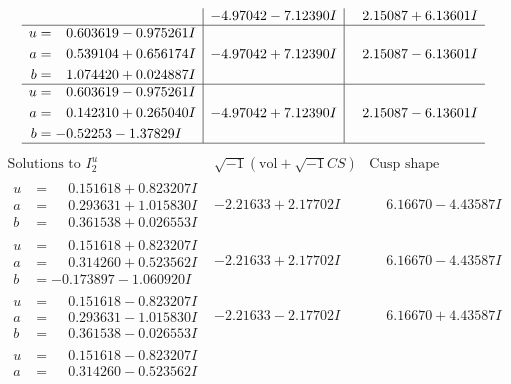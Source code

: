 \documentclass[1p]{elsarticle_modified}
\theoremstyle{definition}
\newcommand{\I}{\sqrt{-1}}
\begin{document}
$$\begin{array}{c|c|c}
 & -4.97042 - 7.12390 I & \phantom{-}2.15087 + 6.13601 I \\ \hline\begin{aligned}
u &= \phantom{-}0.603619 - 0.975261 I \\
a &= \phantom{-}0.539104 + 0.656174 I \\
b &= \phantom{-}1.074420 + 0.024887 I\end{aligned}
 & -4.97042 + 7.12390 I & \phantom{-}2.15087 - 6.13601 I \\ \hline\begin{aligned}
u &= \phantom{-}0.603619 - 0.975261 I \\
a &= \phantom{-}0.142310 + 0.265040 I \\
b &= -0.52253 - 1.37829 I\end{aligned}
 & -4.97042 + 7.12390 I & \phantom{-}2.15087 - 6.13601 I\\
 \hline 
 \end{array}$$\newpage$$\begin{array}{c|c|c}  
\text{Solutions to }I^u_{2}& \I (\text{vol} + \sqrt{-1}CS) & \text{Cusp shape}\\
 \hline 
\begin{aligned}
u &= \phantom{-}0.151618 + 0.823207 I \\
a &= \phantom{-}0.293631 + 1.015830 I \\
b &= \phantom{-}0.361538 + 0.026553 I\end{aligned}
 & -2.21633 + 2.17702 I & \phantom{-}6.16670 - 4.43587 I \\ \hline\begin{aligned}
u &= \phantom{-}0.151618 + 0.823207 I \\
a &= \phantom{-}0.314260 + 0.523562 I \\
b &= -0.173897 - 1.060920 I\end{aligned}
 & -2.21633 + 2.17702 I & \phantom{-}6.16670 - 4.43587 I \\ \hline\begin{aligned}
u &= \phantom{-}0.151618 - 0.823207 I \\
a &= \phantom{-}0.293631 - 1.015830 I \\
b &= \phantom{-}0.361538 - 0.026553 I\end{aligned}
 & -2.21633 - 2.17702 I & \phantom{-}6.16670 + 4.43587 I \\ \hline\begin{aligned}
u &= \phantom{-}0.151618 - 0.823207 I \\
a &= \phantom{-}0.314260 - 0.523562 I \\

\end{aligned}
\end{array}$$
\end{document}
